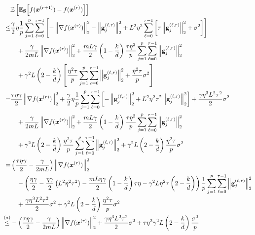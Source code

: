 \documentclass[review,onefignum,onetabnum]{siamart190516}
\begin{document}
\begin{align}
&    \mathbb{E}\left[\mathbb{E}_\mathbf{S}\Big[f({\boldsymbol{x}}^{(r+1)})-f({\boldsymbol{x}}^{(r)})\Big]\right]\\
    \leq &\frac{\gamma}{2}\eta\frac{1}{p}\sum_{j=1}^p\sum_{\ell=0}^{\tau-1}\left[-\left\|\nabla f({\boldsymbol{x}}^{(r)})\right\|_2^2-\left\|\mathbf{g}_j^{(\ell,r)}\right\|_2^2+L^2\eta^2\sum_{\ell=0}^{\tau-1}\left[\tau\left\|{\mathbf{g}}_j^{(\ell,r)}\right\|_2^2+\sigma^2\right]\right]\nonumber\\
    &\quad+ \frac{\gamma}{2mL}\left\|\nabla f({\boldsymbol{x}}^{(r)})\right\|^2_2+\frac{mL\gamma}{2}\left(1-\frac{k}{d}\right)\frac{\tau\eta^2}{p}\sum_{j=1}^{p}\sum_{\ell=0}^{\tau-1}\left\|\mathbf{g}_j^{(\ell,r)}\right\|^2_2\nonumber\\
    &\quad+\gamma^2 L\left(2-\frac{k}{d}\right)\left[\frac{\eta^2\tau}{p}\sum_{j=1}^{p}\sum_{c=0}^{\tau-1}\left\|\mathbf{g}_j^{(\ell,r)}\right\|^2_2+\frac{\eta^2\tau}{p}\sigma^2\right]\nonumber\\
    =&\-\frac{\tau\eta\gamma}{2}\left\|\nabla f({\boldsymbol{x}}^{(r)})\right\|_2^2+\frac{\gamma}{2}\eta\frac{1}{p}\sum_{j=1}^p\sum_{\ell=0}^{\tau-1}\left[-\left\|\mathbf{g}_j^{(\ell,r)}\right\|_2^2+L^2\eta^2\tau^2\left\|{\mathbf{g}}_j^{(\ell,r)}\right\|_2^2\right]+\frac{\gamma\eta^3L^2\tau^2}{2}\sigma^2\nonumber\\
    &\quad+ \frac{\gamma}{2mL}\left\|\nabla f({\boldsymbol{x}}^{(r)})\right\|^2_2+\frac{mL\gamma}{2}\left(1-\frac{k}{d}\right)\frac{\tau\eta^2}{p}\sum_{j=1}^{p}\sum_{\ell=0}^{\tau-1}\left\|\mathbf{g}_j^{(\ell,r)}\right\|^2_2\nonumber\\
    &\quad+\gamma^2 L\left(2-\frac{k}{d}\right)\frac{\eta^2\tau}{p}\sum_{j=1}^{p}\sum_{\ell=0}^{\tau-1}\left\|\mathbf{g}_j^{(\ell,r)}\right\|^2_2+\gamma^2 L\left(2-\frac{k}{d}\right)\frac{\eta^2\tau}{p}\sigma^2\nonumber\\
    =&\-\left(\frac{\tau\eta\gamma}{2}-\frac{\gamma}{2mL}\right)\left\|\nabla f({\boldsymbol{x}}^{(r)})\right\|_2^2\nonumber\\
    &\quad-\left(\frac{\eta\gamma}{2}-\frac{\eta\gamma}{2}\left(L^2\eta^2\tau^2\right)-\frac{mL\eta\gamma}{2}\left(1-\frac{k}{d}\right)\tau\eta-\gamma^2 L\eta^2\tau\left(2-\frac{k}{d}\right)\right)\frac{1}{p}\sum_{j=1}^{p}\sum_{\ell=0}^{\tau-1}\left\|\mathbf{g}_j^{(\ell,r)}\right\|^2_2\nonumber\\
    &\quad+\frac{\gamma\eta^3L^2\tau^2}{2}\sigma^2+\gamma^2 L\left(2-\frac{k}{d}\right)\frac{\eta^2\tau}{p}\sigma^2\nonumber\\
    \stackrel{(a)}{\leq}&-\left(\frac{\tau\eta\gamma}{2}-\frac{\gamma}{2mL}\right)\left\|\nabla f({\boldsymbol{x}}^{(r)})\right\|_2^2+\frac{\gamma\eta^3L^2\tau^2}{2}\sigma^2+\tau\eta^2\gamma^2 L\left(2-\frac{k}{d}\right)\frac{\sigma^2}{p}\label{eq:ncvx-mid-step}
\end{align}
\end{document}
